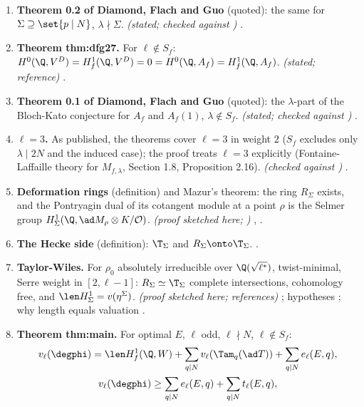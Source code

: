 \begin{enumerate}[label=\textbf{\thechapter.\arabic*}]
\emph{(stated; reference)} .
\item \textbf{Theorem 0.2 of Diamond, Flach and Guo} (quoted): the same for $\Sigma\supseteq\set{p\mid N}$, $\lambda\nmid\Sigma$. \emph{(stated; checked against \cite{DFG04})} .
\item \textbf{Theorem thm:dfg27.} For $\ell\notin S_f$: $H^0(\Q,V^D)=H^1_f(\Q,V^D)=0=H^0(\Q,A_f)=H^1_f(\Q,A_f)$. \emph{(stated; reference)} .
\item \textbf{Theorem 0.1 of Diamond, Flach and Guo} (quoted): the $\lambda$-part of the Bloch-Kato conjecture for $A_f$ and $A_f(1)$, $\lambda\notin S_f$. \emph{(stated; checked against \cite{DFG04})} .
\item \textbf{$\ell=3$.} As published, the theorems cover $\ell=3$ in weight $2$ ($S_f$ excludes only $\lambda\mid2N$ and the induced case); the proof treats $\ell=3$ explicitly (Fontaine-Laffaille theory for $M_{f,\lambda}$, Section 1.8, Proposition 2.16). \emph{(checked
against \cite{DFG04})} .
\item \textbf{Deformation rings} (definition) and Mazur's theorem: the ring $R_\Sigma$ exists, and the Pontryagin dual of its cotangent module at a point $\rho$ is the Selmer group $H^1_\Sigma(\Q,\ad M_\rho\otimes K/\mathcal O)$. \emph{(proof sketched here; \cite{DDT})} ,
.
\item \textbf{The Hecke side} (definition): $\T_\Sigma$ and $R_\Sigma\onto\T_\Sigma$. .
\item \textbf{Taylor-Wiles.} For $\rho_0$ absolutely irreducible over $\Q(\sqrt{\ell^*})$, twist-minimal, Serre weight in $[2,\ell-1]$: $R_\Sigma\simeq\T_\Sigma$ complete intersections, cohomology free, and $\len H^1_\Sigma=v(\eta^\Sigma)$.
\emph{(proof sketched here; references)} ; hypotheses ; why length equals valuation .
\item \textbf{Theorem thm:main.} For optimal $E$, $\ell$ odd, $\ell\nmid N$, $\ell\notin S_f$:
\begin{gather*}
v_\ell(\degphi)=\len H^1_f(\Q,W)+\sum_{q\mid N}v_\ell(\Tam_q(\ad T))+\sum_{q\mid N}e_\ell(E,q),\\
v_\ell(\degphi)\ge\sum_{q\mid N}e_\ell(E,q)+\sum_{q\mid N}t_\ell(E,q),
\end{gather*}

\end{enumerate}
